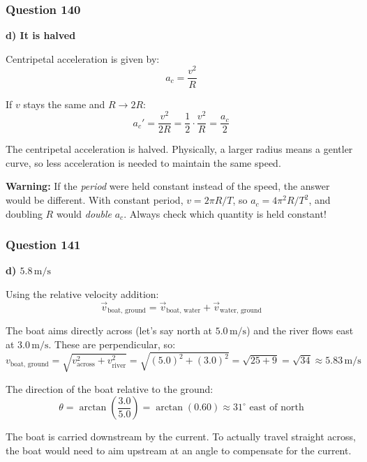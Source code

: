 \documentclass[12pt,letterpaper]{article}
\begin{document}
\subsubsection*{Question 140}

\begin{answerbox}
\textbf{d) It is halved}
\end{answerbox}

\begin{explanationbox}
Centripetal acceleration is given by:
\[
a_c = \frac{v^2}{R}
\]

If $v$ stays the same and $R \to 2R$:
\[
a_c' = \frac{v^2}{2R} = \frac{1}{2}\cdot\frac{v^2}{R} = \frac{a_c}{2}
\]

The centripetal acceleration is halved. Physically, a larger radius means a gentler curve, so less acceleration is needed to maintain the same speed.

\textbf{Warning:} If the \emph{period} were held constant instead of the speed, the answer would be different. With constant period, $v = 2\pi R/T$, so $a_c = 4\pi^2 R/T^2$, and doubling $R$ would \emph{double} $a_c$. Always check which quantity is held constant!
\end{explanationbox}

\subsubsection*{Question 141}

\begin{answerbox}
\textbf{d) $5.8\,\text{m/s}$}
\end{answerbox}

\begin{explanationbox}
Using the relative velocity addition:
\[
\vec{v}_{\text{boat, ground}} = \vec{v}_{\text{boat, water}} + \vec{v}_{\text{water, ground}}
\]

The boat aims directly across (let's say north at $5.0\,\text{m/s}$) and the river flows east at $3.0\,\text{m/s}$. These are perpendicular, so:
\[
v_{\text{boat, ground}} = \sqrt{v_{\text{across}}^2 + v_{\text{river}}^2} = \sqrt{(5.0)^2 + (3.0)^2} = \sqrt{25 + 9} = \sqrt{34} \approx 5.83\,\text{m/s}
\]

The direction of the boat relative to the ground:
\[
\theta = \arctan\left(\frac{3.0}{5.0}\right) = \arctan(0.60) \approx 31^\circ \text{ east of north}
\]

The boat is carried downstream by the current. To actually travel straight across, the boat would need to aim upstream at an angle to compensate for the current.
\end{explanationbox}
\end{document}
